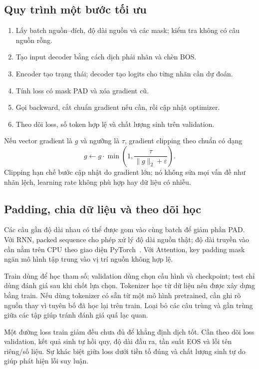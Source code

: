 \documentclass[11pt,a4paper]{article}
\numberwithin{equation}{section}
\begin{document}
\subsection{Quy trình một bước tối ưu}
\begin{enumerate}
\item Lấy batch nguồn--đích, độ dài nguồn và các mask; kiểm tra không có câu nguồn rỗng.
\item Tạo input decoder bằng cách dịch phải nhãn và chèn BOS.
\item Encoder tạo trạng thái; decoder tạo logits cho từng nhãn cần dự đoán.
\item Tính loss có mask PAD và xóa gradient cũ.
\item Gọi backward, cắt chuẩn gradient nếu cần, rồi cập nhật optimizer.
\item Theo dõi loss, số token hợp lệ và chất lượng sinh trên validation.
\end{enumerate}
Nếu vector gradient là $g$ và ngưỡng là $\tau$, gradient clipping theo chuẩn có dạng
\begin{equation}
g\leftarrow g\cdot\min\left(1,\frac{\tau}{\lVert g\rVert_2+\varepsilon}\right).
\end{equation}
Clipping hạn chế bước cập nhật do gradient lớn; nó không sửa mọi vấn đề như nhãn lệch, learning rate không phù hợp hay dữ liệu có nhiễu.

\subsection{Padding, chia dữ liệu và theo dõi học}
Các câu gần độ dài nhau có thể được gom vào cùng batch để giảm phần PAD. Với RNN, packed sequence cho phép xử lý độ dài nguồn thật; độ dài truyền vào cần nằm trên CPU theo giao diện PyTorch~\cite{torchpack}. Với Attention, key padding mask ngăn mô hình tập trung vào vị trí nguồn không hợp lệ.

Train dùng để học tham số; validation dùng chọn cấu hình và checkpoint; test chỉ dùng đánh giá sau khi chốt lựa chọn. Tokenizer học từ dữ liệu nên được xây dựng bằng train. Nếu dùng tokenizer có sẵn từ một mô hình pretrained, cần ghi rõ nguồn thay vì tuyên bố đã học lại trên train. Loại bỏ các câu trùng và gần trùng giữa các tập giúp tránh đánh giá quá lạc quan.

Một đường loss train giảm đều chưa đủ để khẳng định dịch tốt. Cần theo dõi loss validation, kết quả sinh tự hồi quy, độ dài đầu ra, tần suất EOS và lỗi tên riêng/số liệu. Sự khác biệt giữa loss dưới tiền tố đúng và chất lượng sinh tự do giúp phát hiện lỗi suy luận.
\end{document}
